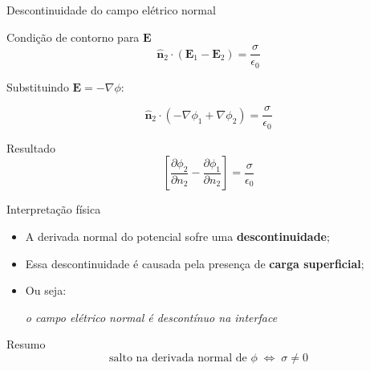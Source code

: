 \documentclass[aspectratio=169,11pt]{beamer}
\begin{document}

\begin{frame}{Descontinuidade do campo elétrico normal}
\begin{block}{Condição de contorno para $\mathbf{E}$}
\begin{equation}
\hat{\mathbf{n}}_2 \cdot (\mathbf{E}_1 - \mathbf{E}_2) = \frac{\sigma}{\epsilon_0}
\end{equation}
\end{block}

\pause

Substituindo $\mathbf{E} = -\nabla \phi$:

\begin{equation}
\hat{\mathbf{n}}_2 \cdot \left(-\nabla \phi_1 + \nabla \phi_2\right) = \frac{\sigma}{\epsilon_0}
\end{equation}

\pause

\begin{alertblock}{Resultado}
\begin{equation}
\left[
\frac{\partial \phi_2}{\partial n_2}
-
\frac{\partial \phi_1}{\partial n_2}
\right]
=
\frac{\sigma}{\epsilon_0}
\tag{3.19}
\end{equation}
\end{alertblock}

\end{frame}


\begin{frame}{Interpretação física}
\begin{itemize}
\item A derivada normal do potencial sofre uma \textbf{descontinuidade};
\item Essa descontinuidade é causada pela presença de \textbf{carga superficial};
\item Ou seja:
\begin{center}
\textit{o campo elétrico normal é descontínuo na interface}
\end{center}
\end{itemize}

\pause

\begin{block}{Resumo}
\begin{equation}
\boxed{
\text{salto na derivada normal de } \phi \;\Longleftrightarrow\; \sigma \neq 0
}
\end{equation}
\end{block}
\end{frame}
\end{document}
